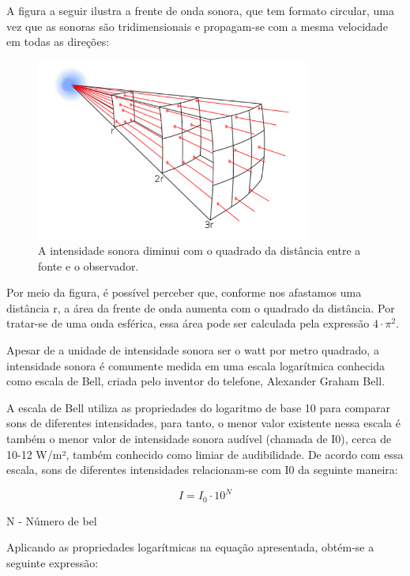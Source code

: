 \documentclass[
	article,		
	11pt,			
	oneside,		
	a4paper,			
	english,			
	brazil			
]{abntex2}
\begin{document}
A figura a seguir ilustra a frente de onda sonora, que tem formato circular, uma vez que as sonoras são tridimensionais e propagam-se com a mesma velocidade em todas as direções:
\begin{figure}[h]
    \includegraphics[width=0.80\textwidth]{intensidade-do-som-e-distancia-2.jpg}
    \centering
    \caption{A intensidade sonora diminui com o quadrado da distância entre a fonte e o observador.}
    \label{fig:Intencidade sonora}
\end{figure}

Por meio da figura, é possível perceber que, conforme nos afastamos uma distância r, a área da frente de onda aumenta com o quadrado da distância. Por tratar-se de uma onda esférica, essa área pode ser calculada pela expressão $4 \cdot \pi^2$.

Apesar de a unidade de intensidade sonora ser o watt por metro quadrado, a intensidade sonora é comumente medida em uma escala logarítmica conhecida como escala de Bell, criada pelo inventor do telefone, Alexander Graham Bell.

A escala de Bell utiliza as propriedades do logaritmo de base 10 para comparar sons de diferentes intensidades, para tanto, o menor valor existente nessa escala é também o menor valor de intensidade sonora audível (chamada de I0), cerca de 10-12 W/m², também conhecido como limiar de audibilidade. De acordo com essa escala, sons de diferentes intensidades relacionam-se com I0 da seguinte maneira:

\begin{equation}
    I = I_0 \cdot 10^N
\end{equation}

\begin{center}
N - Número de bel
\end{center}

Aplicando as propriedades logarítmicas na equação apresentada, obtém-se a seguinte expressão:
\end{document}
